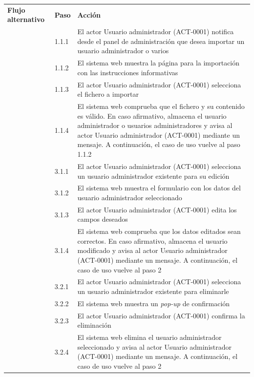 \documentclass[12pt,a4paper, twoside]{report}
\begin{document}
\begin{longtable}{|p{3cm}|p{1cm}|p{12.5cm}|}
		\multirow{0}{3.2cm}{\cellcolor{Gainsboro}\textbf{Flujo alternativo}} & \textbf{Paso} & \textbf{Acción}  	\\ \cline{2-3} 
		\cellcolor{Gainsboro} & 1.1.1 & El actor Usuario administrador (ACT-0001) notifica desde el panel de administración que desea importar un usuario administrador o varios \\ \cline{2-3} 
		\cellcolor{Gainsboro} & 1.1.2 & El sistema web muestra la página para la importación con las instrucciones informativas \\ \cline{2-3} 
		\cellcolor{Gainsboro} & 1.1.3 & El actor Usuario administrador (ACT-0001) selecciona el fichero a importar \\ \cline{2-3} 
		\cellcolor{Gainsboro} & 1.1.4 & El sistema web comprueba que el fichero y su contenido es válido. En caso afirmativo, almacena el usuario administrador o usuarios administradores y avisa al actor Usuario administrador (ACT-0001) mediante un mensaje. A continuación, el caso de uso vuelve al paso 1.1.2 \\ \cline{2-3}
		\cellcolor{Gainsboro} & 3.1.1 & El actor Usuario administrador (ACT-0001) selecciona un usuario administrador existente para su edición \\ \cline{2-3} 
		\cellcolor{Gainsboro} & 3.1.2 & El sistema web muestra el formulario con los datos del usuario administrador seleccionado \\ \cline{2-3} 
		\cellcolor{Gainsboro} & 3.1.3 & El actor Usuario administrador (ACT-0001) edita los campos deseados \\ \cline{2-3} 
		\cellcolor{Gainsboro} & 3.1.4 & El sistema web comprueba que los datos editados sean correctos. En caso afirmativo, almacena el usuario modificado y avisa al actor Usuario administrador (ACT-0001) mediante un mensaje. A continuación, el caso de uso vuelve al paso 2 \\ \cline{2-3} 
		\cellcolor{Gainsboro} & 3.2.1 & El actor Usuario administrador (ACT-0001) selecciona un usuario administrador existente para eliminarle \\ \cline{2-3} 
		\cellcolor{Gainsboro} & 3.2.2 & El sistema web muestra un \textit{pop-up} de confirmación \\ \cline{2-3} 
		\cellcolor{Gainsboro} & 3.2.3 & El actor Usuario administrador (ACT-0001) confirma la eliminación \\ \cline{2-3} 
		\cellcolor{Gainsboro} & 3.2.4 & El sistema web elimina el usuario administrador seleccionado y avisa al actor Usuario administrador (ACT-0001) mediante un mensaje. A continuación, el caso de uso vuelve al paso 2 \\ \cline{2-3} 

\end{longtable}
\end{document}
